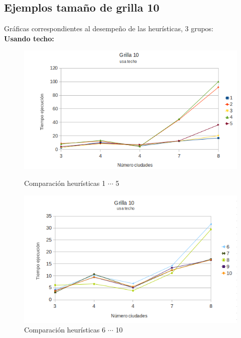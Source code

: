 \documentclass[10pt]{article}
\begin{document}



\newpage
\subsection{Ejemplos tamaño de grilla 10}

Gráficas correspondientes al desempeño de las heurísticas, 3 grupos:\\
\textbf{Usando techo:}


\begin{figure}[ht]
\begin{minipage}[b]{0.45\linewidth}
 \centering
 \includegraphics[width=\textwidth]{grilla10ceil0.png}
 \caption{Comparación heurísticas  1 $\cdots$ 5}
 \label{fig:grid10ceil0}
\end{minipage}
\hspace{0.5cm}
\begin{minipage}[b]{0.45\linewidth}
 
\centering
 \includegraphics[width=\textwidth]{grilla10ceil1.png}
 \caption{Comparación heurísticas  6 $\cdots$ 10}
 \label{fig:grid10ceil1}
\end{minipage}


\end{figure}
\end{document}
